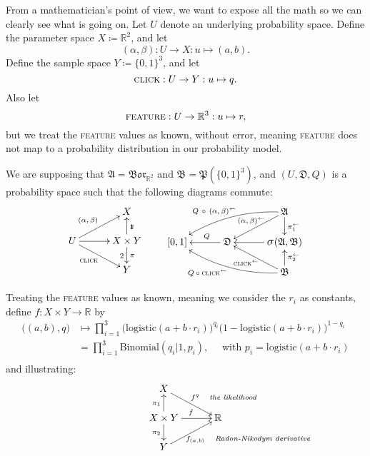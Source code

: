 \documentclass[
twoside=true,
paper=letter,
fontsize=11pt,
pagesize=auto,
leqno,
openany,
headsepline,
overfullrule,
]{scrbook}
\theoremstyle{plain}
\theoremstyle{plain}
\theoremstyle{definition}
\theoremstyle{bfnoteitalic}
\theoremstyle{bfnoteroman}
\newcommand{\sigalg}[1]{\mathfrak{#1}}
\newcommand{\definedby}{\coloneqq}
\newcommand{\borel}{\mathfrak{Bor}}
\newcommand{\sagb}{\mathop{\hbox{\large{$\sigma$}}}\nolimits}
\newcommand{\preimage}[1]{#1^{\leftarrow}}
\newcommand{\R}{\mathbb{R}}
\newcommand{\productsig}[2]{\sagb(#1,#2)}
\newcommand{\powerset}{\mathfrak{P}}
\newcommand{\function}{f}
\newcommand{\measurespace}{X}
\newcommand{\measurespaceii}{Y}
\newcommand{\projectionone}{\pi_1}
\newcommand{\projectiontwo}{\pi_2}
\newcommand{\pspace}{\measurespace}%
\newcommand{\sspace}{\measurespaceii}%
\newcommand{\sspacesig}{\sigalg{B}}
\newcommand{\pspacesig}{\sigalg{A}}
\begin{document}
From a mathematician's point of view, we want to expose all the math so we can clearly see what is going on.
Let $U$ denote an underlying probability space.
Define the parameter space
$\pspace \definedby \R^2$,
and let
\[
(\alpha, \beta):
U\to\pspace:
u\mapsto (a,b).
\]
Define the sample space
$\sspace \definedby \{0,1\}^3 $,
and let
\[
\textsc{click}
:U\to\sspace
:u\mapsto q.
\]
Also let
\[
\textsc{feature}
:U\to\R^3
:u\mapsto r,
\]
but we treat the \textsc{feature} values as known, without error, meaning \textsc{feature} does not map to a probability distribution in our probability model.

We are supposing that
$\pspacesig = \borel_{\R^2}$ and
$\sspacesig=\powerset(\{0,1\}^3)$, and
$(U,\sigalg{D},Q)$ is a probability space such that the following diagrams commute:
\[
\xymatrix@R=16pt@C=30pt{
 & \pspace
 \\
 U \ar[ur]^{\makebox[0pt][r]{\scriptsize{$(\alpha, \beta)$}}}
 \ar[dr]_{\makebox[0pt][r]{\scriptsize{\textsc{click}}}}
 \ar[r] &
 \pspace\times\sspace \ar[u]_\projectionone \ar[d]^\projectiontwo
 \\
  & \sspace \\
}
%
\qquad
%
\xymatrix@R=16pt@C=30pt{
 & & \pspacesig
 \ar[dl]_{\kern45pt\makebox[0pt][r]{\scriptsize{$\preimage{(\alpha, \beta)}$}} }
 \ar[d]^{\preimage{\projectionone}}
 \ar@/_10pt/[lld]_{\kern25pt\makebox[0pt][r]{\scriptsize{$Q\,\circ\,\preimage{(\alpha,\beta)}$}}}
 \\
 [0,1] & \sigalg{D} \ar[l]_-{\ Q} &
 \productsig{\pspacesig}{\sspacesig}
 \ar[l]
 \\
 & & \sspacesig
  \ar[u]_{\preimage{\projectiontwo}}
  \ar[ul]^{\kern20pt\makebox[0pt][r]{\scriptsize{$\preimage{\textsc{click}}$}}}
  \ar@/^10pt/[llu]^{\makebox[0pt][r]{\scriptsize{$Q\circ\preimage{\textsc{click}}$}}}
  \\
}
\]


Treating the \textsc{feature} values as known, meaning we consider the $r_i$ as constants,
define $\function:\pspace\times\sspace \to \R$ by
\begin{align*}
\bigl((a,b),q\bigr)
& \mapsto
\prod_{i=1}^{3}
\bigl( \text{logistic}(a + b\cdot r_i) \bigr)^{q_i}
\bigl( 1 - \text{logistic}(a + b\cdot r_i) \bigr)^{1-q_i} \\
& = \prod_{i=1}^{3}
\text{Binomial}(q_i \vert 1, p_i),\quad
\text{ with $p_i = \text{logistic}(a  + b\cdot r_i )$} \\
\end{align*}
and illustrating:
\[
\xymatrix@R=16pt@C=30pt{
\pspace \ar[dr]^{\ \function^{q}\quad \rlap{\emph{\scriptsize the likelihood}}}
& \\
\pspace\times\sspace
\ar[u]^{\projectionone}
\ar[d]_{\projectiontwo}
\ar[r]^{\function}
& \R \\
\sspace
\ar[ur]_{\function_{(a,b)} \quad \rlap{\emph{\scriptsize Radon-Nikodym derivative}}}
&
}
\]
\end{document}
